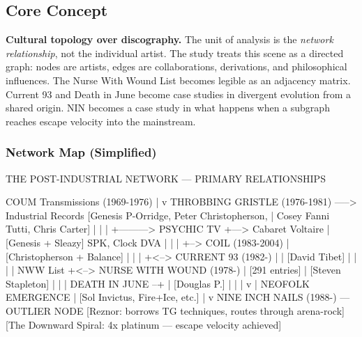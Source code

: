 \documentclass[11pt,letterpaper]{article}
\begin{document}
\subsection{Core Concept}

\textbf{Cultural topology over discography.} The unit of analysis is the \emph{network relationship},
not the individual artist. The study treats this scene as a directed graph: nodes are artists, edges
are collaborations, derivations, and philosophical influences. The Nurse With Wound List becomes
legible as an adjacency matrix. Current 93 and Death in June become case studies in divergent
evolution from a shared origin. NIN becomes a case study in what happens when a subgraph reaches
escape velocity into the mainstream.

\subsubsection{Network Map (Simplified)}

\begin{asciibox}
THE POST-INDUSTRIAL NETWORK — PRIMARY RELATIONSHIPS

  COUM Transmissions (1969-1976)
       |
       v
  THROBBING GRISTLE (1976-1981) -----> Industrial Records
  [Genesis P-Orridge, Peter Christopherson,         |
   Cosey Fanni Tutti, Chris Carter]                 |
       |                                            |
       +---------> PSYCHIC TV                       +---> Cabaret Voltaire
       |           [Genesis + Sleazy]                     SPK, Clock DVA
       |                |
       |                +--> COIL (1983-2004)
       |                     [Christopherson + Balance]
       |                           |
       |                           +<--> CURRENT 93 (1982-)
       |                           |    [David Tibet]
       |                           |         |
       |                    NWW List         +<--> NURSE WITH WOUND (1978-)
       |                    [291 entries]    |    [Steven Stapleton]
       |                                    |
       |                    DEATH IN JUNE --+
       |                    [Douglas P.]
       |                           |
       |                           v
       |                    NEOFOLK EMERGENCE
       |                    [Sol Invictus, Fire+Ice, etc.]
       |
       v
  NINE INCH NAILS (1988-) — OUTLIER NODE
  [Reznor: borrows TG techniques, routes through arena-rock]
  [The Downward Spiral: 4x platinum — escape velocity achieved]
\end{asciibox}
\end{document}
